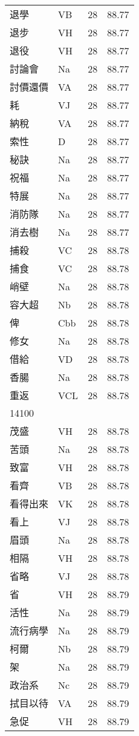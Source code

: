 \documentclass[twocolumn]{book}
\begin{document}
\begin{supertabular}{llrr}
退學 & VB & 28 &  88.77\\
退步 & VH & 28 &  88.77\\
退役 & VH & 28 &  88.77\\
討論會 & Na & 28 &  88.77\\
討價還價 & VA & 28 &  88.77\\
耗 & VJ & 28 &  88.77\\
納稅 & VA & 28 &  88.77\\
索性 & D & 28 &  88.77\\
秘訣 & Na & 28 &  88.77\\
祝福 & Na & 28 &  88.77\\
特展 & Na & 28 &  88.77\\
消防隊 & Na & 28 &  88.77\\
消去樹 & Na & 28 &  88.77\\
捕殺 & VC & 28 &  88.78\\
捕食 & VC & 28 &  88.78\\
峭壁 & Na & 28 &  88.78\\
容大超 & Nb & 28 &  88.78\\
俾 & Cbb & 28 &  88.78\\
修女 & Na & 28 &  88.78\\
借給 & VD & 28 &  88.78\\
香腸 & Na & 28 &  88.78\\
重返 & VCL & 28 &  88.78\\
14100\\
茂盛 & VH & 28 &  88.78\\
苦頭 & Na & 28 &  88.78\\
致富 & VH & 28 &  88.78\\
看齊 & VB & 28 &  88.78\\
看得出來 & VK & 28 &  88.78\\
看上 & VJ & 28 &  88.78\\
眉頭 & Na & 28 &  88.78\\
相隔 & VH & 28 &  88.78\\
省略 & VJ & 28 &  88.78\\
省 & VH & 28 &  88.79\\
活性 & Na & 28 &  88.79\\
流行病學 & Na & 28 &  88.79\\
柯爾 & Nb & 28 &  88.79\\
架 & Na & 28 &  88.79\\
政治系 & Nc & 28 &  88.79\\
拭目以待 & VA & 28 &  88.79\\
急促 & VH & 28 &  88.79\\

\end{supertabular}
\end{document}
